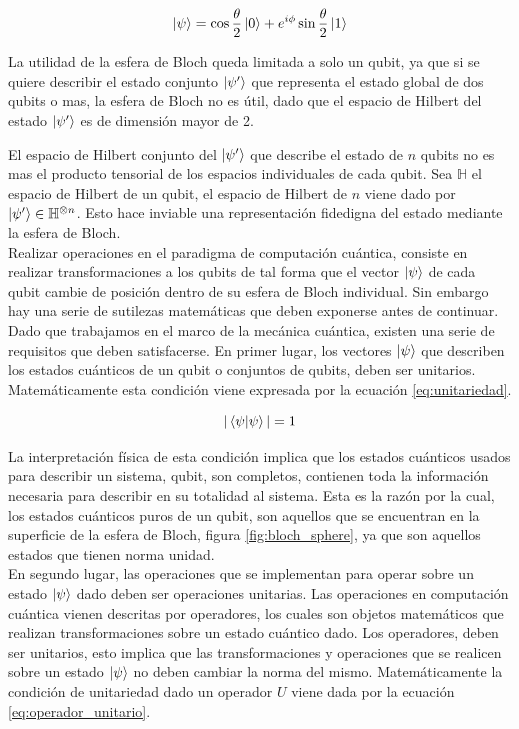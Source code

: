 \begin{equation}
    \ket{\psi} = \cos{\frac{\theta}{2}}\ket{0} + e^{i\phi}\sin{\frac{\theta}{2}}\ket{1}
    \label{eq:estado_bloch}
\end{equation}

La utilidad de la esfera de Bloch queda limitada a solo un qubit, ya que si se quiere describir el estado conjunto $\ket{\psi'}$ que representa el estado global de dos qubits o mas, la esfera de Bloch no es útil, dado que el espacio de Hilbert del estado $\ket{\psi'}$ es de dimensión mayor de 2. 

\newpage

El espacio de Hilbert conjunto del $\ket{\psi'}$ que describe el estado de $n$ qubits no es mas el producto tensorial de los espacios individuales de cada qubit. Sea $\mathbb{H}$ el espacio de Hilbert de un qubit, el espacio de Hilbert de $n$ viene dado por $\ket{\psi'} \in \mathbb{H}^{\otimes n}$. Esto hace inviable una representación fidedigna del estado mediante la esfera de Bloch.\\

Realizar operaciones en el paradigma de computación cuántica, consiste en realizar transformaciones a los qubits de tal forma que el vector $\ket{\psi}$ de cada qubit cambie de posición dentro de su esfera de Bloch individual. Sin embargo hay una serie de sutilezas matemáticas que deben exponerse antes de continuar. Dado que trabajamos en el marco de la mecánica cuántica, existen una serie de requisitos que deben satisfacerse. En primer lugar, los vectores $\ket{\psi}$ que describen los estados cuánticos de un qubit o conjuntos de qubits, deben ser unitarios. Matemáticamente esta condición viene expresada por la ecuación \ref{eq:unitariedad}. 

\begin{equation}
    |\braket{{\psi}|{\psi}}| = 1
    \label{eq:unitariedad}
\end{equation}

La interpretación física de esta condición implica que los estados cuánticos usados para describir un sistema, qubit, son completos, contienen toda la información necesaria para describir en su totalidad al sistema. Esta es la razón por la cual, los estados cuánticos puros de un qubit, son aquellos que se encuentran en la superficie de la esfera de Bloch, figura \ref{fig:bloch_sphere}, ya que son aquellos estados que tienen norma unidad. \\

En segundo lugar, las operaciones que se implementan para operar sobre un estado $\ket{\psi}$ dado deben ser operaciones unitarias. Las operaciones en computación cuántica vienen descritas por operadores, los cuales son objetos matemáticos que realizan transformaciones sobre un estado cuántico dado. Los operadores, deben ser unitarios, esto implica que las transformaciones y operaciones que se realicen sobre un estado $\ket{\psi}$ no deben cambiar la norma del mismo. Matemáticamente la condición de  unitariedad dado un operador $U$ viene dada por la ecuación \ref{eq:operador_unitario}.

